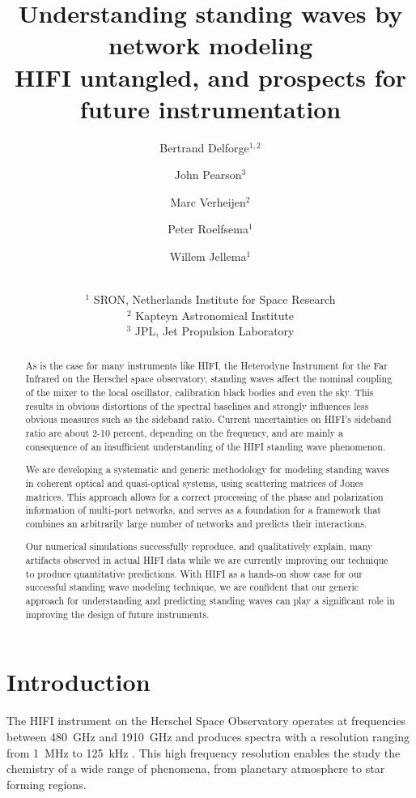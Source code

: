 \documentclass[a4paper,11pt]{article}
\title{Understanding standing waves by network modeling
\\
\large{HIFI untangled, and prospects for future instrumentation}}
\author{Bertrand Delforge$^{1, 2}$
       \and
       John Pearson$^3$
       \and
       Marc Verheijen$^2$
       \and
       Peter Roelfsema$^1$
       \and
       Willem Jellema$^1$
       \and
       \\ \footnotesize $^1$ SRON, Netherlands Institute for Space Research
       \\ \footnotesize $^2$ Kapteyn Astronomical Institute
       \\ \footnotesize $^3$ JPL, Jet Propulsion Laboratory
}
\begin{document}
\maketitle

\begin{abstract}
As is the case for many instruments like HIFI, the Heterodyne Instrument for the Far Infrared on the Herschel space observatory, standing waves affect the nominal coupling of the mixer to the local oscillator, calibration black bodies and even the sky.  This results in obvious distortions of the spectral baselines and strongly influences less obvious measures such as the sideband ratio.  Current uncertainties on HIFI's sideband ratio are about 2-10 percent, depending on the frequency, and are mainly a consequence of an insufficient understanding of the HIFI standing wave phenomenon.

We are developing a systematic and generic methodology for modeling standing waves in coherent optical and quasi-optical systems, using scattering matrices of Jones matrices.  This approach allows for a correct processing of the phase and polarization information of multi-port networks, and serves as a foundation for a framework that combines an arbitrarily large number of networks and predicts their interactions.

Our numerical simulations successfully reproduce, and qualitatively explain, many artifacts observed in actual HIFI data while we are currently improving our technique to produce quantitative predictions.  With HIFI as a hands-on show case for our successful standing wave modeling technique, we are confident that our generic approach for understanding and predicting standing waves can play a significant role in improving the design of future instruments.
\end{abstract}






\section{Introduction}
The HIFI instrument on the Herschel Space Observatory \cite{AA_518_L1} operates at frequencies between \SI{480}{\giga\hertz} and \SI{1910}{\giga\hertz}
and produces spectra with a resolution ranging from \SI{1}{\mega\hertz} to \SI{125}{\kilo\hertz} \cite{AA_518_L6}.
This high frequency resolution enables the study the chemistry of a wide range of phenomena, from planetary atmosphere to star forming regions.
\end{document}
